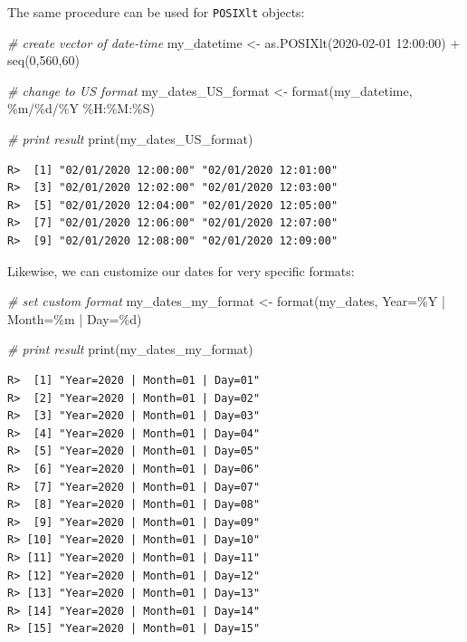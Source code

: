 \documentclass[
  12pt,
]{book}
\newenvironment{Shaded}{\begin{snugshade}}{\end{snugshade}}
\newcommand{\CommentTok}[1]{\textcolor[rgb]{0.37,0.37,0.37}{\textit{#1}}}
\newcommand{\DecValTok}[1]{\textcolor[rgb]{0.06,0.06,0.06}{#1}}
\newcommand{\FunctionTok}[1]{\textcolor[rgb]{0,0,0}{#1}}
\newcommand{\NormalTok}[1]{#1}
\newcommand{\OtherTok}[1]{\textcolor[rgb]{0.37,0.37,0.37}{#1}}
\newcommand{\SpecialCharTok}[1]{\textcolor[rgb]{0,0,0}{#1}}
\newcommand{\StringTok}[1]{\textcolor[rgb]{0.5,0.5,0.5}{#1}}
\begin{document}
The same procedure can be used for \texttt{POSIXlt} objects:

\begin{Shaded}
\begin{Highlighting}[]
\CommentTok{\# create vector of date{-}time}
\NormalTok{my\_datetime }\OtherTok{\textless{}{-}} \FunctionTok{as.POSIXlt}\NormalTok{(}\StringTok{\textquotesingle{}2020{-}02{-}01 12:00:00\textquotesingle{}}\NormalTok{) }\SpecialCharTok{+} \FunctionTok{seq}\NormalTok{(}\DecValTok{0}\NormalTok{,}\DecValTok{560}\NormalTok{,}\DecValTok{60}\NormalTok{)}

\CommentTok{\# change to US format}
\NormalTok{my\_dates\_US\_format }\OtherTok{\textless{}{-}} \FunctionTok{format}\NormalTok{(my\_datetime, }\StringTok{\textquotesingle{}\%m/\%d/\%Y \%H:\%M:\%S\textquotesingle{}}\NormalTok{)}

\CommentTok{\# print result}
\FunctionTok{print}\NormalTok{(my\_dates\_US\_format)}
\end{Highlighting}
\end{Shaded}

\begin{verbatim}
R>  [1] "02/01/2020 12:00:00" "02/01/2020 12:01:00"
R>  [3] "02/01/2020 12:02:00" "02/01/2020 12:03:00"
R>  [5] "02/01/2020 12:04:00" "02/01/2020 12:05:00"
R>  [7] "02/01/2020 12:06:00" "02/01/2020 12:07:00"
R>  [9] "02/01/2020 12:08:00" "02/01/2020 12:09:00"
\end{verbatim}

Likewise, we can customize our dates for very specific formats:

\begin{Shaded}
\begin{Highlighting}[]
\CommentTok{\# set custom format}
\NormalTok{my\_dates\_my\_format }\OtherTok{\textless{}{-}} \FunctionTok{format}\NormalTok{(my\_dates,}
                             \StringTok{\textquotesingle{}Year=\%Y | Month=\%m | Day=\%d\textquotesingle{}}\NormalTok{)}

\CommentTok{\# print result}
\FunctionTok{print}\NormalTok{(my\_dates\_my\_format)}
\end{Highlighting}
\end{Shaded}

\begin{verbatim}
R>  [1] "Year=2020 | Month=01 | Day=01"
R>  [2] "Year=2020 | Month=01 | Day=02"
R>  [3] "Year=2020 | Month=01 | Day=03"
R>  [4] "Year=2020 | Month=01 | Day=04"
R>  [5] "Year=2020 | Month=01 | Day=05"
R>  [6] "Year=2020 | Month=01 | Day=06"
R>  [7] "Year=2020 | Month=01 | Day=07"
R>  [8] "Year=2020 | Month=01 | Day=08"
R>  [9] "Year=2020 | Month=01 | Day=09"
R> [10] "Year=2020 | Month=01 | Day=10"
R> [11] "Year=2020 | Month=01 | Day=11"
R> [12] "Year=2020 | Month=01 | Day=12"
R> [13] "Year=2020 | Month=01 | Day=13"
R> [14] "Year=2020 | Month=01 | Day=14"
R> [15] "Year=2020 | Month=01 | Day=15"
\end{verbatim}
\end{document}
